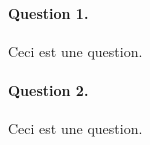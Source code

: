 \documentclass{article}
\begin{document}
\pagetitreETS


\paragraph{Question 1.} Ceci est une question.
\paragraph{Question 2.} Ceci est une question.
\end{document}
